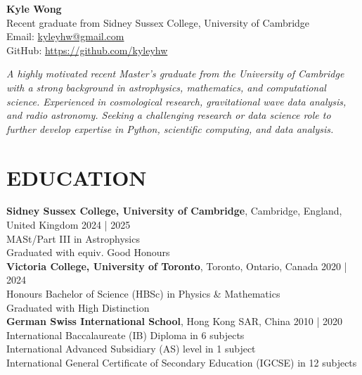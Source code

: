 \documentclass[a4paper,10pt]{extarticle}
\begin{document}
\pagestyle{fancy}
\renewcommand{\headrulewidth}{0pt}
\fancyhead{}
\fancyhead[R]{\textit{\monthyeardate\today}}
\thispagestyle{empty} %

\begin{flushleft}
\textbf{\LARGE Kyle Wong}\\[0.5em] %
Recent graduate from Sidney Sussex College, University of Cambridge
\\ Email: \href{mailto:kyleyhw@gmail.com}{kyleyhw@gmail.com} %
\\ GitHub: \url{https://github.com/kyleyhw}

\vspace{1em}
\textit{A highly motivated recent Master's graduate from the University of Cambridge with a strong background in astrophysics, mathematics, and computational science. Experienced in cosmological research, gravitational wave data analysis, and radio astronomy. Seeking a challenging research or data science role to further develop expertise in Python, scientific computing, and data analysis.}
\end{flushleft}

\section*{EDUCATION}
\textbf{Sidney Sussex College, University of Cambridge}, Cambridge, England, United Kingdom \hfill 2024 | 2025\\
MASt/Part III in Astrophysics\\
Graduated with equiv. Good Honours\\



\textbf{Victoria College, University of Toronto}, Toronto, Ontario, Canada \hfill 2020 | 2024\\ %
Honours Bachelor of Science (HBSc) in Physics \& Mathematics\\
Graduated with High Distinction\\


\textbf{German Swiss International School}, Hong Kong SAR, China \hfill 2010 | 2020\\ %
International Baccalaureate (IB) Diploma in 6 subjects\\
International Advanced Subsidiary (AS) level in 1 subject\\
International General Certificate of Secondary Education (IGCSE) in 12 subjects
\end{document}
